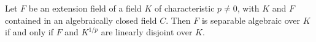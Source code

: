 Let $F$ be an extension field of a field $K$ of characteristic $p \neq 0$, with $K$ and $F$ contained in an algebraically closed field $C$.
Then $F$ is separable algebraic over $K$ if and only if $F$ and $K^{1/p}$ are linearly disjoint over $K$.
